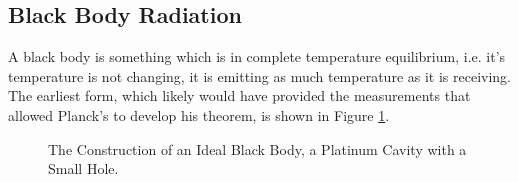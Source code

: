 \documentclass[../../Quantum-Technologies-Notes]{subfiles}
\begin{document}
		\pagebreak
		
		
		
		
		\subsection{Black Body Radiation}
			A black body is something which is in complete temperature equilibrium, i.e. it's temperature is not changing, it is emitting as much temperature as it is receiving. The earliest form, which likely would have provided the measurements that allowed Planck's to develop his theorem, is shown in Figure \ref{fig:hole_w_cav_ideal_black_body}\cite{wiki_black_body_cav_w_hole}. \linebreak
			
			\begin{figure}[!h]
				\centering
				
				\caption{The Construction of an Ideal Black Body, a Platinum Cavity with a Small Hole.}
				\label{fig:hole_w_cav_ideal_black_body}
			\end{figure}
			\vspace{10mm}
			
			
			
\end{document}
